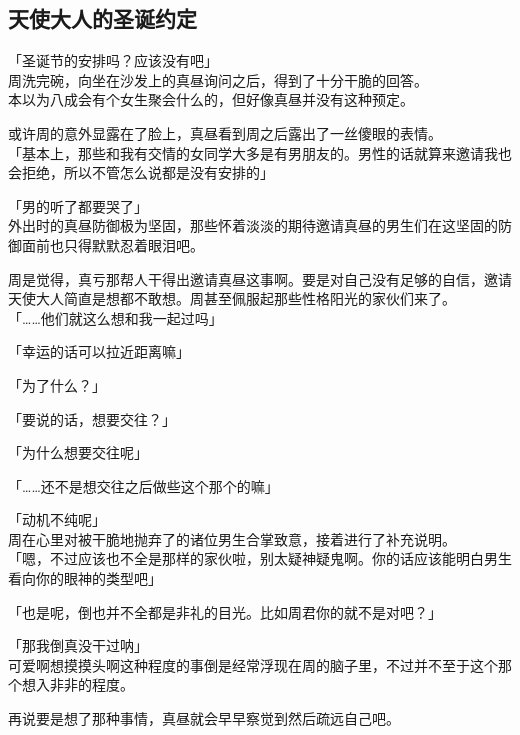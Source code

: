 \subsection{天使大人的圣诞约定}

「圣诞节的安排吗？应该没有吧」\\

周洗完碗，向坐在沙发上的真昼询问之后，得到了十分干脆的回答。\\

本以为八成会有个女生聚会什么的，但好像真昼并没有这种预定。

或许周的意外显露在了脸上，真昼看到周之后露出了一丝傻眼的表情。\\

「基本上，那些和我有交情的女同学大多是有男朋友的。男性的话就算来邀请我也会拒绝，所以不管怎么说都是没有安排的」

「男的听了都要哭了」\\

外出时的真昼防御极为坚固，那些怀着淡淡的期待邀请真昼的男生们在这坚固的防御面前也只得默默忍着眼泪吧。

周是觉得，真亏那帮人干得出邀请真昼这事啊。要是对自己没有足够的自信，邀请天使大人简直是想都不敢想。周甚至佩服起那些性格阳光的家伙们来了。\\

「……他们就这么想和我一起过吗」

「幸运的话可以拉近距离嘛」

「为了什么？」

「要说的话，想要交往？」

「为什么想要交往呢」

「……还不是想交往之后做些这个那个的嘛」

「动机不纯呢」\\

周在心里对被干脆地抛弃了的诸位男生合掌致意，接着进行了补充说明。\\

「嗯，不过应该也不全是那样的家伙啦，别太疑神疑鬼啊。你的话应该能明白男生看向你的眼神的类型吧」

「也是呢，倒也并不全都是非礼的目光。比如周君你的就不是对吧？」

「那我倒真没干过呐」\\

可爱啊想摸摸头啊这种程度的事倒是经常浮现在周的脑子里，不过并不至于这个那个想入非非的程度。

再说要是想了那种事情，真昼就会早早察觉到然后疏远自己吧。\\

